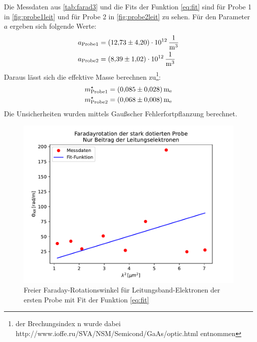 Die Messdaten aus \autoref{tab:farad3} und die Fits der Funktion \autoref{eq:fit} sind für Probe 1 in \autoref{fig:probe1leit} und für Probe 2 in \autoref{fig:probe2leit} zu sehen.
Für den Parameter $a$ ergeben sich folgende Werte:
\begin{equation} \label{eq:para}
\begin{split}
a_\text{Probe1}& = \SI{12,73\pm4,20e12}{\per\metre\cubed}\\
a_\text{Probe2}& = \SI{8,39\pm1,02e12}{\per\metre\cubed}
\end{split}
\end{equation}
Daraus lässt sich die effektive Masse berechnen zu\footnote{der Brechungsindex n wurde dabei http://www.ioffe.ru/SVA/NSM/Semicond/GaAs/optic.html entnommen}:
\begin{equation} \label{eq:efmas}
\begin{split}
m^\star_\text{Probe1}& = \SI{0,085\pm0,028}{m_e}\\
m^\star_\text{Probe2}& = \SI{0,068\pm0,008}{m_e}
\end{split}
\end{equation}
Die Unsicherheiten wurden mittels Gaußscher Fehlerfortpflanzung berechnet.

\begin{figure}
\includegraphics{content/grafiken/probe1leitungs.pdf}
\caption{Freier Faraday-Rotationswinkel für Leitungsband-Elektronen der ersten Probe mit Fit der Funktion \autoref{eq:fit}}
\label{fig:probe1leit}
\end{figure}



